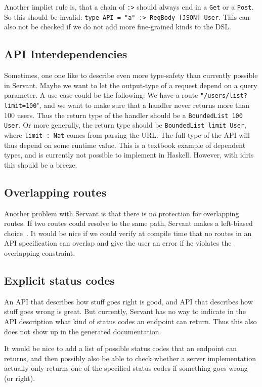 \documentclass[12pt,a4paper]{article}
\begin{document}
Another implict rule is, that a chain of \texttt{:>} should always end in a \texttt{Get} or a \texttt{Post}. So this should be invalid: \texttt{type API = "a" :> ReqBody [JSON] User}.  This can also not be checked if we do not add more fine-grained kinds to the DSL.

\subsection{API Interdependencies}
\label{sec:inter}
Sometimes, one one like to describe even more type-safety than currently possible in Servant. Maybe we want to let the output-type of a request depend on a query parameter. A use case could be the following: We have a route \texttt{"/users/list?limit=100}", and we want to make sure that a handler never returns more than 100 users.  Thus the return type of the handler should be a \texttt{BoundedList 100 User}. Or more generally, the return type should be \texttt{BoundedList limit User}, where \texttt{limit : Nat} comes from parsing the URL.  The full type of the API will thus depend on some runtime value. This is a textbook example of dependent types, and is currently not possible to implement in Haskell. However, with idris this should be a breeze.

\subsection{Overlapping routes}
Another problem with Servant is that there is no protection for overlapping routes. If two routes could resolve to the same path, Servant makes a left-biased choice~\cite{servant}.
It would be nice if we could verify at compile time that no routes in an API specification can overlap and give the user an error if he violates the overlapping constraint.


\subsection{Explicit status codes}
An API that describes how stuff goes right is good, and API that describes how stuff goes wrong is great. But currently, Servant has no way to indicate in the API description what kind of status codes an endpoint can return. Thus this also does not show up in the generated documentation.

It would be nice to add a list of possible status codes that an endpoint can returns, and then possibly also be able to check whether a server implementation actually only returns one of the specified status codes if something goes wrong (or right).
\end{document}
